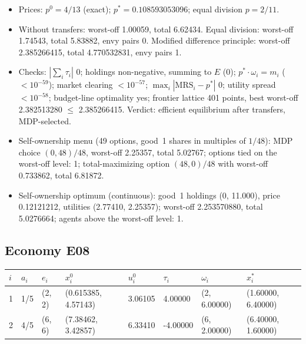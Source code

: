 \begin{itemize}[leftmargin=1.2em,itemsep=0pt,topsep=2pt]\footnotesize
\item Prices: $p^0 = 4/13$ (exact); $p^* = 0.108593053096$; equal division $p = 2/11$.
\item Without transfers: worst-off 1.00059, total 6.62434. Equal division: worst-off 1.74543, total 5.83882, envy pairs 0. Modified difference principle: worst-off 2.385266415, total 4.770532831, envy pairs 1.
\item Checks: $|\sum_i\tau_i|$ 0; holdings non-negative, summing to $E$ (0); $p^*\cdot\omega_i = m_i$ ($<10^{-59}$); market clearing $<10^{-57}$; $\max_i|\mathrm{MRS}_i - p^*|$ 0; utility spread $<10^{-58}$; budget-line optimality yes; frontier lattice 401 points, best worst-off 2.382513280 $\leq$ 2.385266415. Verdict: efficient equilibrium after transfers, MDP-selected.
\item Self-ownership menu (49 options, good~1 shares in multiples of $1/48$): MDP choice $(0, 48)/48$, worst-off 2.25357, total 5.02767; options tied on the worst-off level: 1; total-maximizing option $(48, 0)/48$ with worst-off 0.733862, total 6.81872.
\item Self-ownership optimum (continuous): good~1 holdings (0, 11.000), price 0.12121212, utilities (2.77410, 2.25357); worst-off 2.253570880, total 5.0276664; agents above the worst-off level: 1.
\end{itemize}

\subsection*{Economy E08}
\label{ec:E08}
{\scriptsize\setlength{\tabcolsep}{3pt}
\begin{tabular}{@{}llllllll@{}}
\toprule
$i$ & $a_i$ & $e_i$ & $x^0_i$ & $u^0_i$ & $\tau_i$ & $\omega_i$ & $x^*_i$ \\
\midrule
1 & 1/5 & (2, 2) & (0.615385, 4.57143) & 3.06105 & 4.00000 & (2, 6.00000) & (1.60000, 6.40000) \\
2 & 4/5 & (6, 6) & (7.38462, 3.42857) & 6.33410 & -4.00000 & (6, 2.00000) & (6.40000, 1.60000) \\
\bottomrule\end{tabular}}

